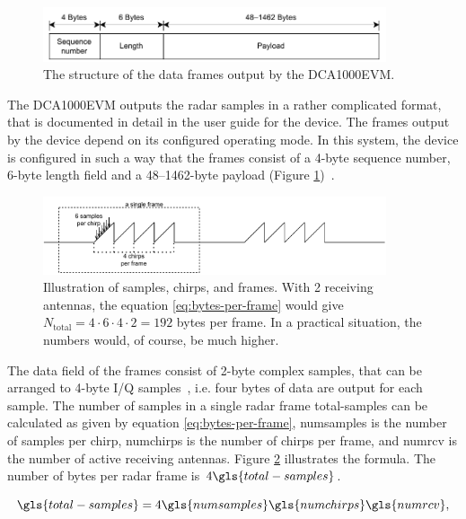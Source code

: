 \begin{figure}[H]
    \centering
    \includegraphics[width=0.9\textwidth]{fig/2/radar-frame-bytes.pdf}
    \caption{The structure of the data frames output by the DCA1000EVM.}
    \label{fig:radar-frame-bytes}
\end{figure}

The DCA1000EVM outputs the radar samples in a rather complicated format,
that is documented in detail in the user guide for the device.
The frames output by the device depend on its configured operating mode.
In this system, the device is configured in such a way that the frames consist of a 4-byte sequence number,
6-byte length field and a 48--1462-byte payload (Figure \ref{fig:radar-frame-bytes})~\cite{dca1000-user-guide}.

\begin{figure}[H]
    \centering
    \includegraphics[width=0.9\textwidth]{fig/2/2-radar-sampling.pdf}
    \caption{Illustration of samples, chirps, and frames. With 2 receiving antennas,
    the equation \ref{eq:bytes-per-frame} would give $N_{\mathrm{total}} = 4\cdot6\cdot4\cdot2 = 192$ bytes per frame.
    In a practical situation, the numbers would, of course, be much higher.}
    \label{fig:2-radar-signal-sampling}
\end{figure}

The data field of the frames consist of 2-byte complex samples,
that can be arranged to 4-byte I/Q samples~\cite{dca1000-raw-data-capture},
i.e. four bytes of data are output for each sample.
The number of samples in a single radar frame \gls{total-samples} can be calculated as given by equation \ref{eq:bytes-per-frame},
\gls{numsamples} is the number of samples per chirp,
\gls{numchirps} is the number of chirps per frame,
and \gls{numrcv} is the number of active receiving antennas.
Figure \ref{fig:2-radar-signal-sampling} illustrates the formula.
The number of bytes per radar frame is $4 \gls{total-samples}$.

\begin{equation}
\label{eq:bytes-per-frame}
    \gls{total-samples} = 4 \gls{numsamples} \gls{numchirps}  \gls{numrcv},
\end{equation}


